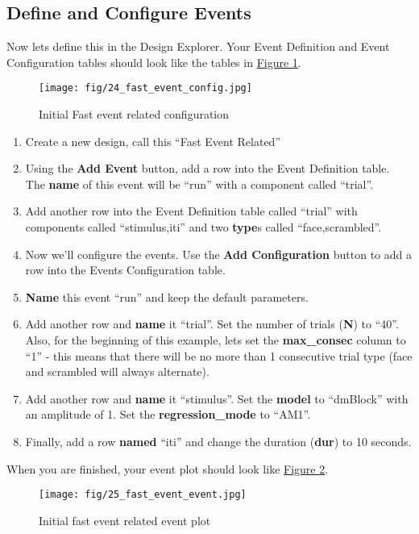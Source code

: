 \documentclass[10pt]{article}
\begin{document}
	\subsection{Define and Configure Events}
	\label{subsec:u6define}
		Now lets define this in the Design Explorer.
		Your Event Definition and Event Configuration tables should look like the tables in \hyperref[fig:fast_event_config]{Figure \ref{fig:fast_event_config}}.
		\begin{figure}[ht]
			\centering
			\texttt{[image: fig/24\_fast\_event\_config.jpg]}
			\caption{Initial Fast event related configuration}
			\label{fig:fast_event_config}
		\end{figure}
		\begin{enumerate}
			\item Create a new design, call this ``Fast Event Related''
			\item Using the \textbf{Add Event} button, add a row into the Event Definition table.
			The \textbf{name} of this event will be ``run'' with a component called ``trial''.
			\item Add another row into the Event Definition table called ``trial'' with components called ``stimulus,iti'' and two \textbf{type}s called ``face,scrambled''.
			\item Now we'll configure the events. Use the \textbf{Add Configuration} button to add a row into the Events Configuration table.
			\item \textbf{Name} this event ``run'' and keep the default parameters.
			\item Add another row and \textbf{name} it ``trial''.
			Set the number of trials (\textbf{N}) to ``40''.
			Also, for the beginning of this example, lets set the \textbf{max\_consec} column to ``1'' - this means that there will be no more than 1 consecutive trial type (face and scrambled will always alternate).
			\item Add another row and \textbf{name} it ``stimulus''.
			Set the \textbf{model} to ``dmBlock'' with an amplitude of 1.
			Set the \textbf{regression\_mode} to ``AM1''.
			\item Finally, add a row \textbf{named} ``iti'' and change the duration (\textbf{dur}) to 10 seconds.
		\end{enumerate}
		When you are finished, your event plot should look like \hyperref[fig:fast_event_plot]{Figure \ref{fig:fast_event_plot}}.
		\begin{figure}[ht]
			\centering
			\texttt{[image: fig/25\_fast\_event\_event.jpg]}
			\caption{Initial fast event related event plot}
			\label{fig:fast_event_plot}
		\end{figure}
\end{document}
